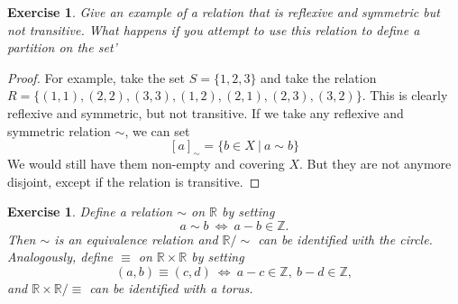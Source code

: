\documentclass[a4paper, 11pt]{book}
\theoremstyle{plain}
\newtheorem{exercise}[theorem]{Exercise}
\theoremstyle{plain}
\begin{document}
\begin{exercise}
Give an example of a relation that is reflexive and symmetric but not transitive.
What happens if you attempt to use this relation to define a partition on the set'
\end{exercise}
\begin{proof}
For example, take the set $S=\{1,2,3\}$ and take the relation $R= \{(1,1),(2,2),(3,3),(1,2),(2,1),(2,3),(3,2)\}$. This is clearly reflexive and symmetric, but not transitive. If we take any reflexive and symmetric relation $\sim$, we can set
$$[a]_\sim = \{b\in X~\vert~a\sim b\}$$
We would still have them non-empty and covering $X$. But they are not anymore disjoint, except if the relation is transitive.
\end{proof}

\begin{exercise}
Define a relation $\sim$ on $\mathbb{R}$ by setting
$$a\sim b~\Leftrightarrow~a-b\in\mathbb{Z}.$$
Then $\sim$ is an equivalence relation and $\mathbb{R}/\sim$ can be identified with the circle. Analogously, define $\equiv$ on $\mathbb{R}\times \mathbb{R}$ by setting
$$(a,b)\equiv (c,d)~\Leftrightarrow~a-c\in \mathbb{Z},~b-d\in \mathbb{Z},$$
and $\mathbb{R}\times \mathbb{R}/\equiv$ can be identified with a torus.
\end{exercise}
\end{document}
